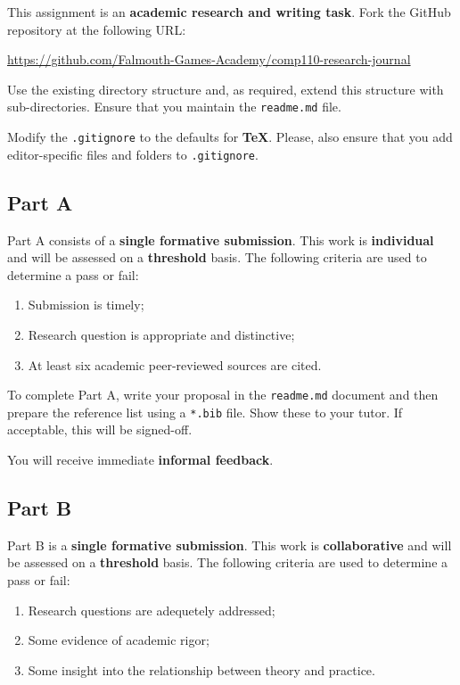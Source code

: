 \documentclass{../fal_assignment}
\begin{document}
This assignment is an \textbf{academic research and writing task}. Fork the GitHub repository at the following URL:

\indent \url{https://github.com/Falmouth-Games-Academy/comp110-research-journal}

Use the existing directory structure and, as required, extend this structure with sub-directories. Ensure that you maintain the \texttt{readme.md} file.

Modify the \texttt{.gitignore} to the defaults for \textbf{TeX}. Please, also ensure that you add editor-specific files and folders to \texttt{.gitignore}. 

\subsection*{Part A}

Part A consists of a \textbf{single formative submission}. This work is \textbf{individual} and will be assessed on a \textbf{threshold} basis. The following criteria are used to determine a pass or fail:

\begin{enumerate}[label=(\alph*)]
	\item Submission is timely;
	\item Research question is appropriate and distinctive;
	\item At least six academic peer-reviewed sources are cited.
\end{enumerate}

To complete Part A, write your proposal in the \texttt{readme.md} document and then prepare the reference list using a \texttt{*.bib} file.  Show these to your tutor.  If acceptable, this will be signed-off. 

You will receive immediate \textbf{informal feedback}.

\subsection*{Part B}

Part B is a \textbf{single formative submission}. This work is \textbf{collaborative} and will be assessed on a \textbf{threshold} basis. The following criteria are used to determine a pass or fail:

\begin{enumerate}[label=(\alph*)]
	\item Research questions are adequetely addressed;
	\item Some evidence of academic rigor;
	\item Some insight into the relationship between theory and practice.
\end{enumerate}
\end{document}
